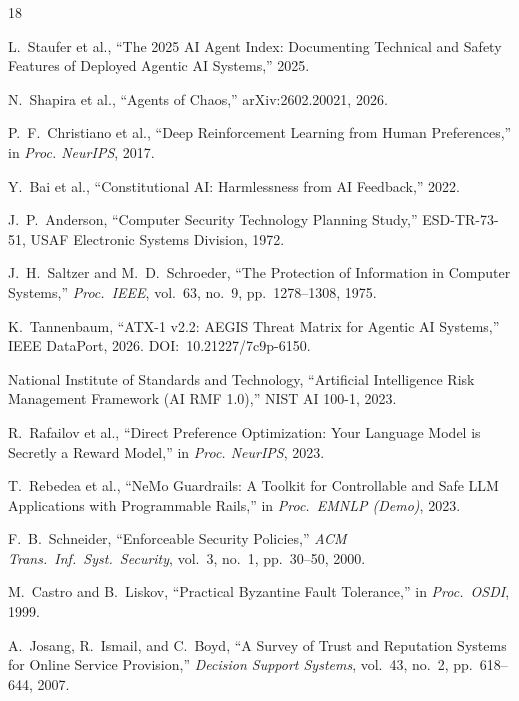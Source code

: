 \documentclass[journal]{IEEEtran}
\begin{document}
\begin{thebibliography}{18}

L.~Staufer et al., ``The 2025 AI Agent Index: Documenting Technical and Safety Features of Deployed Agentic AI Systems,'' 2025.

N.~Shapira et al., ``Agents of Chaos,'' arXiv:2602.20021, 2026.

P.~F.~Christiano et al., ``Deep Reinforcement Learning from Human Preferences,'' in \textit{Proc. NeurIPS}, 2017.

Y.~Bai et al., ``Constitutional AI: Harmlessness from AI Feedback,'' 2022.

J.~P.~Anderson, ``Computer Security Technology Planning Study,'' ESD-TR-73-51, USAF Electronic Systems Division, 1972.

J.~H.~Saltzer and M.~D.~Schroeder, ``The Protection of Information in Computer Systems,'' \textit{Proc.\ IEEE}, vol.~63, no.~9, pp.~1278--1308, 1975.

K.~Tannenbaum, ``ATX-1 v2.2: AEGIS Threat Matrix for Agentic AI Systems,'' IEEE DataPort, 2026. DOI:~10.21227/7c9p-6150.

National Institute of Standards and Technology, ``Artificial Intelligence Risk Management Framework (AI RMF 1.0),'' NIST AI 100-1, 2023.

R.~Rafailov et al., ``Direct Preference Optimization: Your Language Model is Secretly a Reward Model,'' in \textit{Proc. NeurIPS}, 2023.

T.~Rebedea et al., ``NeMo Guardrails: A Toolkit for Controllable and Safe LLM Applications with Programmable Rails,'' in \textit{Proc.\ EMNLP (Demo)}, 2023.

F.~B.~Schneider, ``Enforceable Security Policies,'' \textit{ACM Trans.\ Inf.\ Syst.\ Security}, vol.~3, no.~1, pp.~30--50, 2000.

M.~Castro and B.~Liskov, ``Practical Byzantine Fault Tolerance,'' in \textit{Proc.\ OSDI}, 1999.

A.~Josang, R.~Ismail, and C.~Boyd, ``A Survey of Trust and Reputation Systems for Online Service Provision,'' \textit{Decision Support Systems}, vol.~43, no.~2, pp.~618--644, 2007.


\end{thebibliography}
\end{document}
